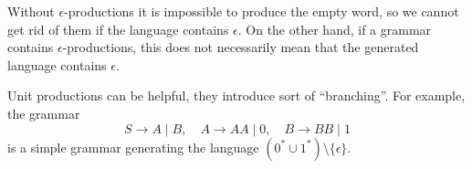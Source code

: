 

\setcounter{section}{5}
\setcounter{subsection}{2}
\setcounter{dfn}{7}


Without $\epsilon$-productions it is impossible to produce the empty word,
so we cannot get rid of them if the language contains $\epsilon$.
On the other hand, if a grammar contains $\epsilon$-productions,
this does not necessarily mean that the generated language contains $\epsilon$.

Unit productions can be helpful, they introduce sort of ``branching''. For example, the grammar
\[
S \to A \mid B, \quad A \to AA \mid 0, \quad B \to BB \mid 1
\]
is a simple grammar generating the language $(0^* \cup 1^*) \setminus \{\epsilon\}$.




